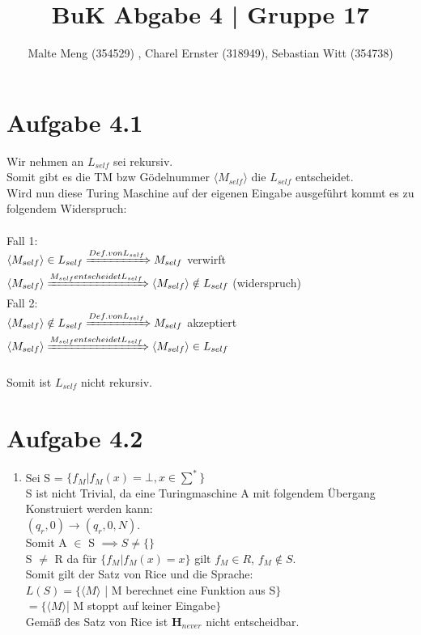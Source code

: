 \documentclass{article}
\title{BuK Abgabe 4 | Gruppe 17}
\author{Malte Meng (354529) , Charel Ernster (318949), Sebastian Witt (354738)}
\begin{document}
	\maketitle 
	\section[a 4.1]{Aufgabe 4.1}
		Wir nehmen an $L_{self}$ sei rekursiv.\\
		Somit gibt es die TM bzw Gödelnummer $\langle M_{self}\rangle$ die $L_{self}$ entscheidet.\\
		Wird nun diese Turing Maschine auf der eigenen Eingabe ausgeführt kommt es zu folgendem Widerspruch:\\\\
		Fall 1:\\
		$\langle M_{self}\rangle \in L_{self} \xRightarrow{Def. von L_{self}} M_{self}$ verwirft $\langle M_{self}\rangle \\
		\xRightarrow{M_{self} entscheidet L_{self}} \langle M_{self}\rangle \notin L_{self}$ (widerspruch)\\
		Fall 2:\\
		$\langle M_{self}\rangle \notin L_{self} \xRightarrow{Def. von L_{self}} M_{self}$ akzeptiert $\langle M_{self}\rangle\\ \xRightarrow{M_{self} entscheidet L_{self}} \langle M_{self}\rangle \in L_{self}$\\\\
		Somit ist $L_{self}$ nicht rekursiv.\\
	\section[a 4.2]{Aufgabe 4.2}
		\begin{enumerate} [label=\alph*.]
			\item Sei S = $\{f_M|f_M(x) = \bot, x \in \sum^*\}$\\
			S ist nicht Trivial, da eine Turingmaschine A mit folgendem Übergang Konstruiert werden kann: \\$(q_r,0) \rightarrow (q_r,0,N)$.\\ Somit A $\in$ S $\implies S \neq \{\}$\\
			S $\neq$ R da für $\{f_M|f_M(x) = x\}$ gilt $f_M \in R$, $f_M \notin S$.\\
			Somit gilt der Satz von Rice und die Sprache:\\
			$L(S) = \{\langle M\rangle$ | M berechnet eine Funktion aus S$\}$\\
			$= \{\langle M\rangle $| M stoppt auf keiner Eingabe$\}$\\
			Gemäß des Satz von Rice ist $\textbf{H}_{never}$ nicht entscheidbar.
		\end{enumerate}
\end{document}
